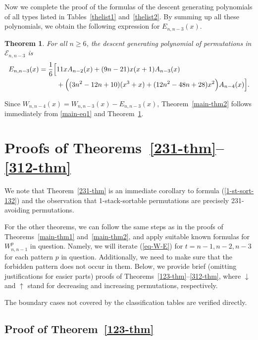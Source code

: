 \documentclass[11pt]{article}
\newtheorem{thm}{Theorem}
\newcommand{\exactly}[2]{\ensuremath{\mathcal{E}_{#1,#2}}}
\newcommand{\+}{\mbox{\ensuremath{\scriptstyle{+}}}}
\begin{document}
Now we complete the proof of the formulas of the descent generating polynomials of all types listed in  Tables~\ref{thelist1} and~\ref{thelist2}.
By summing  up all these polynomials, we obtain the following expression for $E_{n,n-3}(x)$.

\begin{thm}\label{main}
	For all $n\geq 6$, the descent generating polynomial of permutations in $\exactly{n}{n-3}$ is
	\begingroup
	\begin{align}
		E_{n,n-3}(x)=\frac16\Big[&11xA_{n-2}(x)
		+(9n-21)x(x+1)A_{n-3}(x)\notag\\
		&+\Big((3n^2-12n+10)(x^3+x)
		+(12n^2-48n+28)x^2\Big)A_{n-4}(x)\Big]. \notag
	\end{align}
	\endgroup
\end{thm}
Since $W_{n,n-4}(x)  = W_{n,n-3}(x) - E_{n,n-3}(x)$, Theorem~\ref{main-thm2} follows immediately from \eqref{main-eq1} and Theorem~\ref{main}.

\section{Proofs of Theorems~\ref{231-thm}--\ref{312-thm}}\label{sec-remaining-proofs}

We note that Theorem~\ref{231-thm} is an immediate corollary to formula (\ref{1-st-sort-132}) and the observation that  1-stack-sortable permutations are precisely 231-avoiding permutations.

For the other theorems, we can follow the same steps as in the proofs of Theorems~\ref{main-thm1} and~\ref{main-thm2}, and apply suitable known formulas for $W^{p}_{n,n-1}$ in question. Namely, we will iterate (\ref{eq-W-E}) for $t=n-1, n-2, n-3$ for each pattern $p$ in question. Additionally, we need to make sure that the forbidden pattern does not occur in them. Below, we provide brief (omitting justifications for easier parts) proofs of Theorems~\ref{123-thm}--\ref{312-thm}, where $\downarrow$ and $\uparrow$ stand for decreasing and increasing permutations, respectively.

The boundary cases not covered by the classification tables are verified directly.

\subsection{Proof of Theorem~\ref{123-thm}}
\end{document}
